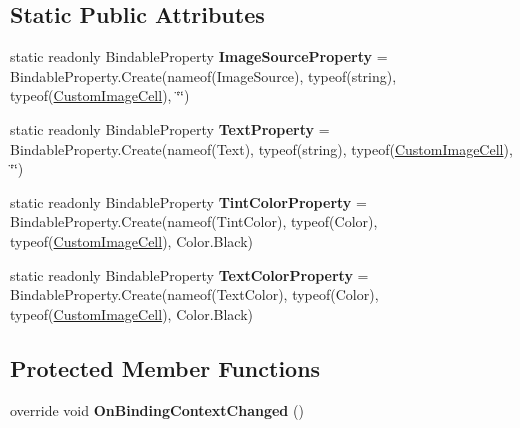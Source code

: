 \subsection*{Static Public Attributes}
\begin{DoxyCompactItemize}
\item 
\mbox{\label{class_pocket_saver_1_1_helpers_1_1_custom_image_cell_aea48b309b2352d8e1bd0956385d1ad75}} 
static readonly Bindable\+Property {\bfseries Image\+Source\+Property} = Bindable\+Property.\+Create(nameof(Image\+Source), typeof(string), typeof(\hyperlink{class_pocket_saver_1_1_helpers_1_1_custom_image_cell}{Custom\+Image\+Cell}), \char`\"{}\char`\"{})
\item 
\mbox{\label{class_pocket_saver_1_1_helpers_1_1_custom_image_cell_a8ecfcf21a28f0e562af4a1057b2812ef}} 
static readonly Bindable\+Property {\bfseries Text\+Property} = Bindable\+Property.\+Create(nameof(Text), typeof(string), typeof(\hyperlink{class_pocket_saver_1_1_helpers_1_1_custom_image_cell}{Custom\+Image\+Cell}), \char`\"{}\char`\"{})
\item 
\mbox{\label{class_pocket_saver_1_1_helpers_1_1_custom_image_cell_a1a0959726ac43e4edce8835071be4919}} 
static readonly Bindable\+Property {\bfseries Tint\+Color\+Property} = Bindable\+Property.\+Create(nameof(Tint\+Color), typeof(Color), typeof(\hyperlink{class_pocket_saver_1_1_helpers_1_1_custom_image_cell}{Custom\+Image\+Cell}), Color.\+Black)
\item 
\mbox{\label{class_pocket_saver_1_1_helpers_1_1_custom_image_cell_a8b14499e269b99078270681080a0c3a2}} 
static readonly Bindable\+Property {\bfseries Text\+Color\+Property} = Bindable\+Property.\+Create(nameof(Text\+Color), typeof(Color), typeof(\hyperlink{class_pocket_saver_1_1_helpers_1_1_custom_image_cell}{Custom\+Image\+Cell}), Color.\+Black)
\end{DoxyCompactItemize}
\subsection*{Protected Member Functions}
\begin{DoxyCompactItemize}
\item 
\mbox{\label{class_pocket_saver_1_1_helpers_1_1_custom_image_cell_a50f823444df75ae279914e413ec2ae89}} 
override void {\bfseries On\+Binding\+Context\+Changed} ()
\end{DoxyCompactItemize}
